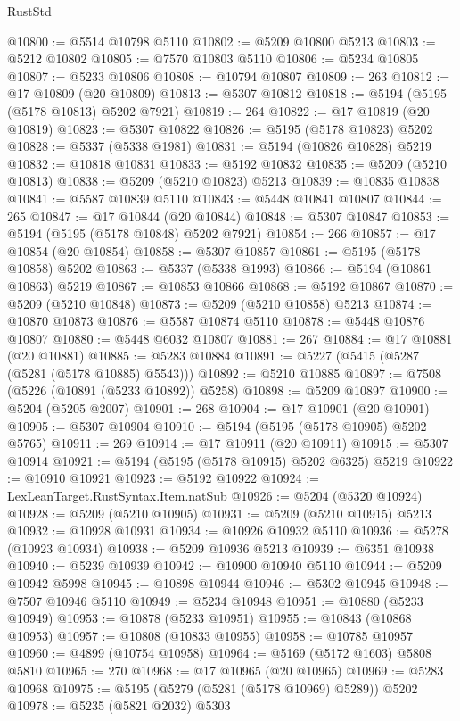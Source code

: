 \begin{lexlean}{RustStd}
\begin{coremodule}
@10800 := @5514 @10798 @5110
@10802 := @5209 @10800 @5213
@10803 := @5212 @10802
@10805 := @7570 @10803 @5110
@10806 := @5234 @10805
@10807 := @5233 @10806
@10808 := @10794 @10807
@10809 := 263
@10812 := @17 @10809 (@20 @10809)
@10813 := @5307 @10812
@10818 := @5194 (@5195 (@5178 @10813) @5202 @7921)
@10819 := 264
@10822 := @17 @10819 (@20 @10819)
@10823 := @5307 @10822
@10826 := @5195 (@5178 @10823) @5202
@10828 := @5337 (@5338 @1981)
@10831 := @5194 (@10826 @10828) @5219
@10832 := @10818 @10831
@10833 := @5192 @10832
@10835 := @5209 (@5210 @10813)
@10838 := @5209 (@5210 @10823) @5213
@10839 := @10835 @10838
@10841 := @5587 @10839 @5110
@10843 := @5448 @10841 @10807
@10844 := 265
@10847 := @17 @10844 (@20 @10844)
@10848 := @5307 @10847
@10853 := @5194 (@5195 (@5178 @10848) @5202 @7921)
@10854 := 266
@10857 := @17 @10854 (@20 @10854)
@10858 := @5307 @10857
@10861 := @5195 (@5178 @10858) @5202
@10863 := @5337 (@5338 @1993)
@10866 := @5194 (@10861 @10863) @5219
@10867 := @10853 @10866
@10868 := @5192 @10867
@10870 := @5209 (@5210 @10848)
@10873 := @5209 (@5210 @10858) @5213
@10874 := @10870 @10873
@10876 := @5587 @10874 @5110
@10878 := @5448 @10876 @10807
@10880 := @5448 @6032 @10807
@10881 := 267
@10884 := @17 @10881 (@20 @10881)
@10885 := @5283 @10884
@10891 := @5227 (@5415 (@5287 (@5281 (@5178 @10885) @5543)))
@10892 := @5210 @10885
@10897 := @7508 (@5226 (@10891 (@5233 @10892)) @5258)
@10898 := @5209 @10897
@10900 := @5204 (@5205 @2007)
@10901 := 268
@10904 := @17 @10901 (@20 @10901)
@10905 := @5307 @10904
@10910 := @5194 (@5195 (@5178 @10905) @5202 @5765)
@10911 := 269
@10914 := @17 @10911 (@20 @10911)
@10915 := @5307 @10914
@10921 := @5194 (@5195 (@5178 @10915) @5202 @6325) @5219
@10922 := @10910 @10921
@10923 := @5192 @10922
@10924 := LexLeanTarget.RustSyntax.Item.natSub
@10926 := @5204 (@5320 @10924)
@10928 := @5209 (@5210 @10905)
@10931 := @5209 (@5210 @10915) @5213
@10932 := @10928 @10931
@10934 := @10926 @10932 @5110
@10936 := @5278 (@10923 @10934)
@10938 := @5209 @10936 @5213
@10939 := @6351 @10938
@10940 := @5239 @10939
@10942 := @10900 @10940 @5110
@10944 := @5209 @10942 @5998
@10945 := @10898 @10944
@10946 := @5302 @10945
@10948 := @7507 @10946 @5110
@10949 := @5234 @10948
@10951 := @10880 (@5233 @10949)
@10953 := @10878 (@5233 @10951)
@10955 := @10843 (@10868 @10953)
@10957 := @10808 (@10833 @10955)
@10958 := @10785 @10957
@10960 := @4899 (@10754 @10958)
@10964 := @5169 (@5172 @1603) @5808 @5810
@10965 := 270
@10968 := @17 @10965 (@20 @10965)
@10969 := @5283 @10968
@10975 := @5195 (@5279 (@5281 (@5178 @10969) @5289)) @5202
@10978 := @5235 (@5821 @2032) @5303

\end{coremodule}
\end{lexlean}
